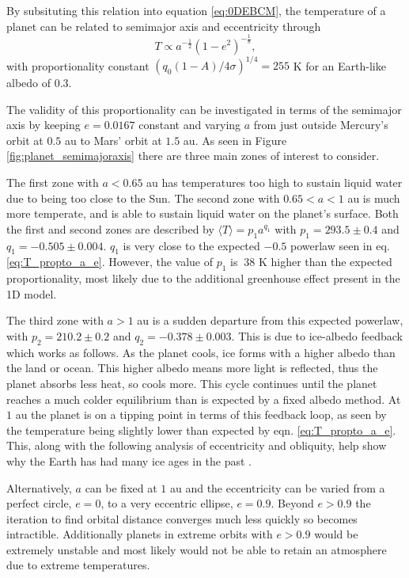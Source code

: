 \documentclass[12pt, onecolumn]{revtex4-2}    %
\begin{document}
By subsituting this relation into equation \eqref{eq:0DEBCM}, the temperature of a planet can be related to semimajor axis and eccentricity through
\begin{equation}
  T \propto a^{-\frac{1}{2}} (1-e^2)^{-\frac{1}{8}}, \label{eq:T_propto_a_e}
\end{equation}
with proportionality constant $(q_0 (1-A) / 4\sigma)^{1/4} = 255$ K for an Earth-like albedo of 0.3.


The validity of this proportionality can be investigated in terms of the semimajor axis by keeping $e = 0.0167$ constant and varying $a$ from just outside Mercury's orbit at $0.5$ au to Mars' orbit at $1.5$ au.
As seen in Figure \ref{fig:planet_semimajoraxis} there are three main zones of interest to consider.

The first zone with $a < 0.65$ au has temperatures too high to sustain liquid water due to being too close to the Sun.
The second zone with $0.65 < a < 1$ au is much more temperate, and is able to sustain liquid water on the planet's surface.
Both the first and second zones are described by $\langle T \rangle = p_1 a^{q_1}$ with $p_1 = 293.5 \pm 0.4$ and $q_1= -0.505 \pm 0.004$. $q_1$ is very close to the expected $-0.5$ powerlaw seen in eq. \eqref{eq:T_propto_a_e}.
However, the value of $p_1$ is $~38$ K higher than the expected proportionality, most likely due to the additional greenhouse effect present in the 1D model.

The third zone with $a > 1$ au is a sudden departure from this expected powerlaw, with $p_2 = 210.2 \pm 0.2$ and $q_2 = -0.378 \pm 0.003$.
This is due to ice-albedo feedback which works as follows.
As the planet cools, ice forms with a higher albedo than the land or ocean.
This higher albedo means more light is reflected, thus the planet absorbs less heat, so cools more.
This cycle continues until the planet reaches a much colder equilibrium than is expected by a fixed albedo method.
At $1$ au the planet is on a tipping point in terms of this feedback loop, as seen by the temperature being slightly lower than expected by eqn. \eqref{eq:T_propto_a_e}.
This, along with the following analysis of eccentricity and obliquity, help show why the Earth has had many ice ages in the past \cite{Emiliani78}.

Alternatively, $a$ can be fixed at $1$ au and the eccentricity can be varied from a perfect circle, $e = 0$, to a very eccentric ellipse, $e = 0.9$.
Beyond $e > 0.9$ the iteration to find orbital distance converges much less quickly so becomes intractible.
Additionally planets in extreme orbits with $e > 0.9$ would be extremely unstable and most likely would not be able to retain an atmosphere due to extreme temperatures.
\end{document}
